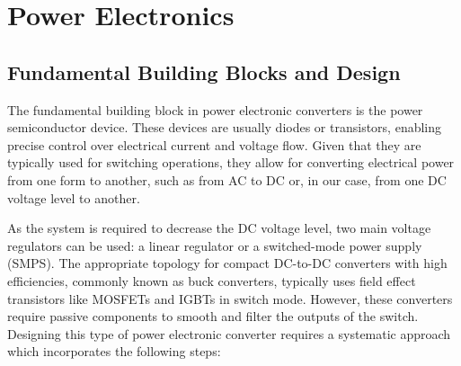 \section{Power Electronics}
    \subsection{Fundamental Building Blocks and Design}
        The fundamental building block in power electronic converters is the power semiconductor device. These devices are usually diodes or transistors, enabling precise control over electrical current and voltage flow. Given that they are typically used for switching operations, they allow for converting electrical power from one form to another, such as from AC to DC or, in our case, from one DC voltage level to another. 

        As the system is required to decrease the DC voltage level, two main voltage regulators can be used: a linear regulator or a switched-mode power supply (SMPS). The appropriate topology for compact DC-to-DC converters with high efficiencies, commonly known as buck converters, typically uses field effect transistors like MOSFETs and IGBTs in switch mode. However, these converters require passive components to smooth and filter the outputs of the switch. Designing this type of power electronic converter requires a systematic approach which incorporates the following steps:

